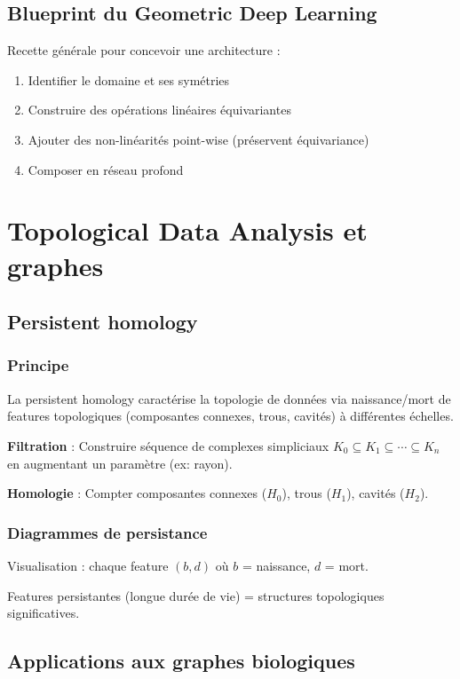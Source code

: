 \subsection{Blueprint du Geometric Deep Learning}

Recette générale pour concevoir une architecture :
\begin{enumerate}
    \item Identifier le domaine et ses symétries
    \item Construire des opérations linéaires équivariantes
    \item Ajouter des non-linéarités point-wise (préservent équivariance)
    \item Composer en réseau profond
\end{enumerate}

\section{Topological Data Analysis et graphes}

\subsection{Persistent homology}

\subsubsection{Principe}

La persistent homology caractérise la topologie de données via naissance/mort de features topologiques (composantes connexes, trous, cavités) à différentes échelles.

\textbf{Filtration} : Construire séquence de complexes simpliciaux $K_0 \subseteq K_1 \subseteq \cdots \subseteq K_n$ en augmentant un paramètre (ex: rayon).

\textbf{Homologie} : Compter composantes connexes ($H_0$), trous ($H_1$), cavités ($H_2$).

\subsubsection{Diagrammes de persistance}

Visualisation : chaque feature $(b, d)$ où $b$ = naissance, $d$ = mort.

Features persistantes (longue durée de vie) = structures topologiques significatives.

\subsection{Applications aux graphes biologiques}

